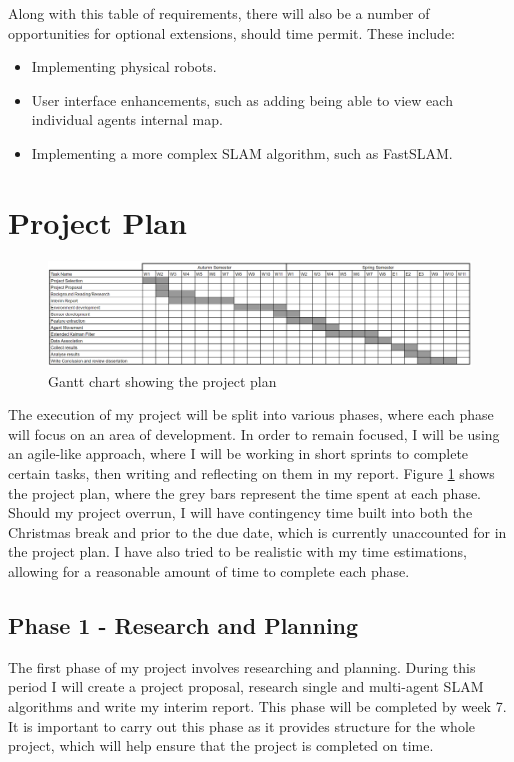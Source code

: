 \documentclass[12pt]{article}
\begin{document}
Along with this table of requirements, there will also be a number of opportunities for optional extensions, should time permit.
These include:
\begin{itemize}
    \item Implementing physical robots.
    \item User interface enhancements, such as adding being able to view each individual agents internal map.
    \item Implementing a more complex SLAM algorithm, such as FastSLAM.
\end{itemize}

\section{Project Plan}
\begin{figure}[H]
    \centering
    \includegraphics[width=0.8\linewidth]{gantt_chart.png}
    \caption{Gantt chart showing the project plan}
    \label{fig:gantt_chart}
\end{figure}
The execution of my project will be split into various phases, where each phase will focus on an area of development.
In order to remain focused, I will be using an agile-like approach, where I will be working in short sprints to complete
certain tasks, then writing and reflecting on them in my report. Figure \ref{fig:gantt_chart} shows the project plan,
where the grey bars represent the time spent at each phase. Should my project overrun, I will have contingency time
built into both the Christmas break and prior to the due date, which is currently unaccounted for in the project plan.
I have also tried to be realistic with my time estimations, allowing for a reasonable amount of time to complete each
phase.\\

\subsection{Phase 1 - Research and Planning}
The first phase of my project involves researching and planning. During this period I will create a project proposal,
research single and multi-agent SLAM algorithms and write my interim report. This phase will be completed by week 7. It is
important to carry out this phase as it provides structure for the whole project, which will help ensure that the project is
completed on time.
\end{document}
